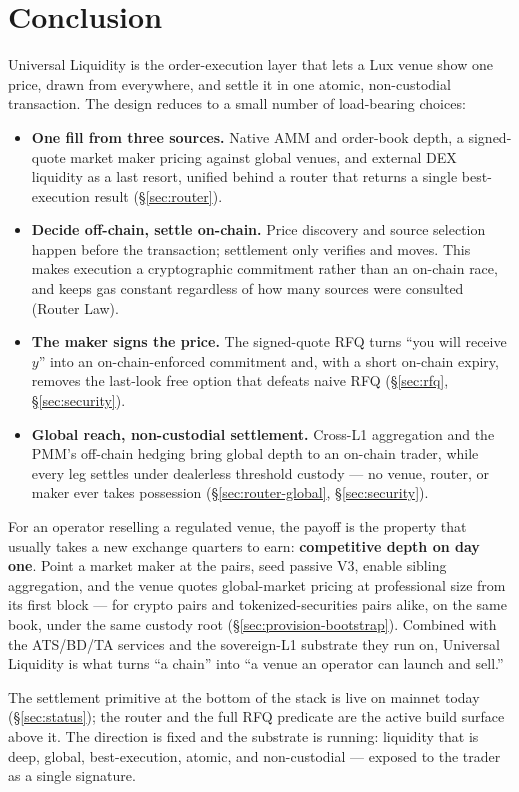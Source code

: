 \section{Conclusion}
\label{sec:conclusion}

Universal Liquidity is the order-execution layer that lets a Lux venue show
one price, drawn from everywhere, and settle it in one atomic, non-custodial
transaction. The design reduces to a small number of load-bearing choices:

\begin{itemize}[leftmargin=1.4em]
  \item \textbf{One fill from three sources.} Native AMM and order-book
  depth, a signed-quote market maker pricing against global venues, and
  external DEX liquidity as a last resort, unified behind a router that
  returns a single best-execution result (\S\ref{sec:router}).
  \item \textbf{Decide off-chain, settle on-chain.} Price discovery and
  source selection happen before the transaction; settlement only verifies
  and moves. This makes execution a cryptographic commitment rather than an
  on-chain race, and keeps gas constant regardless of how many sources were
  consulted (Router Law).
  \item \textbf{The maker signs the price.} The signed-quote RFQ turns ``you
  will receive $y$'' into an on-chain-enforced commitment and, with a short
  on-chain expiry, removes the last-look free option that defeats naive RFQ
  (\S\ref{sec:rfq}, \S\ref{sec:security}).
  \item \textbf{Global reach, non-custodial settlement.} Cross-L1
  aggregation and the PMM's off-chain hedging bring global depth to an
  on-chain trader, while every leg settles under dealerless threshold
  custody --- no venue, router, or maker ever takes possession
  (\S\ref{sec:router-global}, \S\ref{sec:security}).
\end{itemize}

For an operator reselling a regulated venue, the payoff is the property that
usually takes a new exchange quarters to earn: \textbf{competitive depth on
day one}. Point a market maker at the pairs, seed passive V3, enable sibling
aggregation, and the venue quotes global-market pricing at professional size
from its first block --- for crypto pairs and tokenized-securities pairs
alike, on the same book, under the same custody root
(\S\ref{sec:provision-bootstrap}). Combined with the ATS/BD/TA services and
the sovereign-L1 substrate they run on, Universal Liquidity is what turns
``a chain'' into ``a venue an operator can launch and sell.''

The settlement primitive at the bottom of the stack is live on mainnet
today (\S\ref{sec:status}); the router and the full RFQ predicate are the
active build surface above it. The direction is fixed and the substrate is
running: liquidity that is deep, global, best-execution, atomic, and
non-custodial --- exposed to the trader as a single signature.
